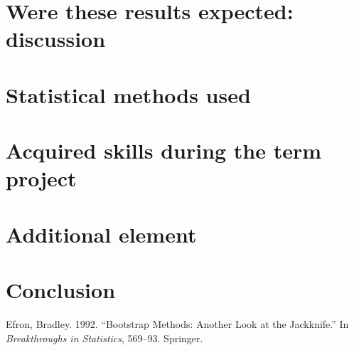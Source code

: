 \documentclass[11pt,]{article}
\begin{document}
\hypertarget{were-these-results-expected-discussion}{%
\section{Were these results expected:
discussion}\label{were-these-results-expected-discussion}}

\hypertarget{statistical-methods-used}{%
\section{Statistical methods used}\label{statistical-methods-used}}

\hypertarget{acquired-skills-during-the-term-project}{%
\section{Acquired skills during the term
project}\label{acquired-skills-during-the-term-project}}

\hypertarget{additional-element}{%
\section{Additional element}\label{additional-element}}

\hypertarget{conclusion}{%
\section*{Conclusion}\label{conclusion}}

\hypertarget{refs}{}
\leavevmode\hypertarget{ref-efron1992bootstrap}{}%
Efron, Bradley. 1992. ``Bootstrap Methods: Another Look at the
Jackknife.'' In \emph{Breakthroughs in Statistics}, 569--93. Springer.
\end{document}
